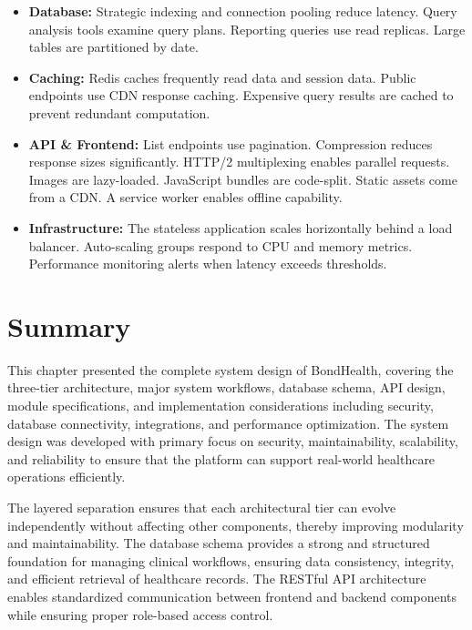 \begin{itemize}
    \item \textbf{Database:} Strategic indexing and connection pooling reduce latency. Query analysis tools examine query plans. Reporting queries use read replicas. Large tables are partitioned by date.

    \item \textbf{Caching:} Redis caches frequently read data and session data. Public endpoints use CDN response caching. Expensive query results are cached to prevent redundant computation.

    \item \textbf{API \& Frontend:} List endpoints use pagination. Compression reduces response sizes significantly. HTTP/2 multiplexing enables parallel requests. Images are lazy-loaded. JavaScript bundles are code-split. Static assets come from a CDN. A service worker enables offline capability. \
    
    \item \textbf{Infrastructure:} The stateless application scales horizontally behind a load balancer. Auto-scaling groups respond to CPU and memory metrics. Performance monitoring alerts when latency exceeds thresholds.
\end{itemize}


\section{Summary}

\justifying
\noindent This chapter presented the complete system design of BondHealth, covering the three-tier architecture, major system workflows, database schema, API design, module specifications, and implementation considerations including security, database connectivity, integrations, and performance optimization. The system design was developed with primary focus on security, maintainability, scalability, and reliability to ensure that the platform can support real-world healthcare operations efficiently.

\justifying
\noindent The layered separation ensures that each architectural tier can evolve independently without affecting other components, thereby improving modularity and maintainability. The database schema provides a strong and structured foundation for managing clinical workflows, ensuring data consistency, integrity, and efficient retrieval of healthcare records. The RESTful API architecture enables standardized communication between frontend and backend components while ensuring proper role-based access control.

